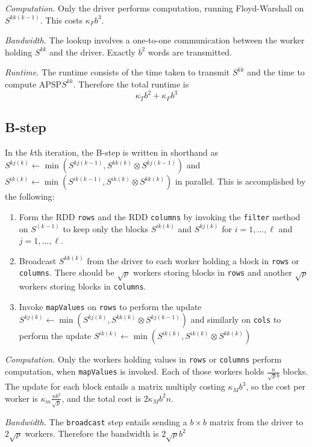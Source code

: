 \documentclass{article} %
\begin{document}
\emph{Computation.} Only the driver performs computation, running
Floyd-Warshall on $S^{kk(k-1)}$.  This costs $\kappa_F b^3$.

\emph{Bandwidth.}
The lookup involves a one-to-one communication between the worker holding $S^{kk}$ and the driver.
Exactly $b^2$ words are transmitted.

\emph{Runtime.}
The runtime consists of the time taken to transmit $S^{kk}$ and the time to compute $\text{APSP}S^{kk}$.
Therefore the total runtime is
\[
\kappa_T b^2 + \kappa_F b^3
\]

\subsection{B-step}
In the $k$th iteration, the B-step is written in shorthand as
 $S^{kj(k)} \leftarrow \min(S^{kj(k-1)}, S^{kk(k)} \otimes S^{kj(k-1)})$ 
and 
$S^{ik(k)} \leftarrow \min(S^{ik(k-1)}, S^{ik(k)} \otimes S^{kk(k)})$
 in parallel.
This is accomplished by the following:
\begin{enumerate}
\item Form the RDD {\tt rows} and the RDD {\tt columns} by invoking
  the {\tt filter} method on $S^{(k-1)}$ to keep only the blocks
  $S^{ik(k)}$ and $S^{kj(k)}$ for $i = 1,\hdots, \ell$ and $j =
  1,\hdots, \ell$.
\item Broadcast $S^{kk(k)}$ from the driver to each worker holding a
  block in {\tt rows} or {\tt columns}.  There should be $\sqrt{p}$
  workers storing blocks in {\tt rows} and another $\sqrt{p}$ workers
  storing blocks in {\tt columns}.
\item Invoke {\tt mapValues} on {\tt rows} to perform the update
  $S^{kj(k)} \leftarrow \min(S^{kj(k)}, S^{kk(k)} \otimes S^{kj(k-1)})$ and similarly
  on {\tt cols} to perform the update $S^{ik(k)} \leftarrow \min(S^{ik(k)}, S^{ik(k)}
  \otimes S^{kk(k)})$
\end{enumerate}

\emph{Computation.}  Only the workers holding values in {\tt rows} or
     {\tt columns} perform computation, when {\tt mapValues} is
     invoked.  Each of those workers holds $\frac{n}{\sqrt{p}b}$
     blocks.  The update for each block entails a matrix multiply
     costing $\kappa_M b^3$, so the cost per worker is $\kappa_m
     \frac{nb^2}{\sqrt{p}}$, and the total cost is $2\kappa_M b^2 n$.

\emph{Bandwidth.} The {\tt broadcast} step entails sending a $b \times
b$ matrix from the driver to $2\sqrt{p}$ workers.  Therefore the
bandwidth is $2\sqrt{p}b^2$
\end{document}
